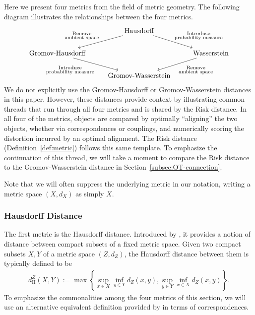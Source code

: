 \documentclass[twoside,11pt]{article}
\newcommand{\dH}{d_\mathrm{H}}
\begin{document}
Here we present four metrics from the field of metric geometry. The following diagram \citep[inspired by][Fig. 2]{memoli_gromovwasserstein_2011} illustrates the relationships between the four metrics. 
\[
\begin{tikzcd}
   & \text{Hausdorff} \ar[dl,"\substack{\text{Remove}\\\text{ambient space}}",swap] \ar[dr,"\substack{\text{Introduce}\\\text{probability measure}}"]\\
   \text{Gromov-Hausdorff}\ar[dr,"\substack{\text{Introduce}\\\text{probability measure}}",swap] & & \text{Wasserstein} \ar[dl,"\substack{\text{Remove}\\\text{ambient space}}"]\\
   & \text{Gromov-Wasserstein}
\end{tikzcd}  
\]
We do not explicitly use the Gromov-Hausdorff or Gromov-Wasserstein distances in this paper. However, these distances provide context by illustrating common threads that run through all four metrics and is shared by the Risk distance. In all four of the metrics, objects are compared by optimally ``aligning'' the two objects, whether via correspondences or couplings, and numerically scoring the distortion incurred by an optimal alignment. The Risk distance (Definition~\ref{def:metric}) follows this same template. To emphasize the continuation of this thread, we will take a moment to compare the Risk distance to the Gromov-Wasserstein distance in Section~\ref{subsec:OT-connection}.


Note that we will often suppress the underlying metric in our notation, writing a metric space $(X,d_X)$ as simply $X$.

\subsubsection{Hausdorff Distance}
The first metric is the Hausdorff distance. Introduced by \citet{hausdorff_grundzuge_1914}, it provides a notion of distance between compact subsets of a fixed metric space. Given two compact subsets $X,Y$ of a metric space $(Z,d_Z)$, the Hausdorff distance between them is typically defined to be
\begin{align*}
    \dH^Z(X,Y) := \max\left\{\sup_{x\in X} \inf_{y\in Y} d_Z(x,y), \sup_{y\in Y} \inf_{x\in X} d_Z(x,y)\right\}.
\end{align*}
To emphasize the commonalities among the four metrics of this section, we will use an alternative equivalent definition provided by \citet[Prop. 2.1]{memoli_gromovwasserstein_2011} in terms of correspondences. 
\end{document}
